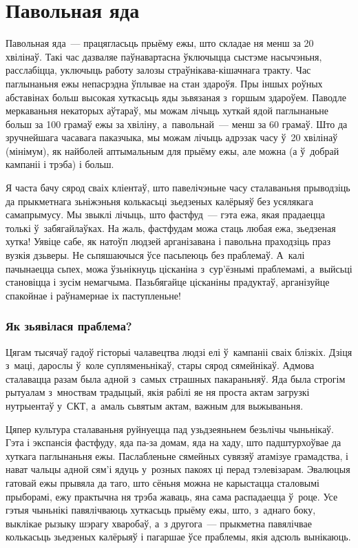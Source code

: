 \chapter{Павольная яда}

Павольная яда~--- працягласьць прыёму ежы, што складае ня менш за 20 хвілінаў. Такі час дазваляе паўнавартасна ўключыцца сыстэме насычэньня, расслабіцца, уключыць работу залозы страўнікава-кішачнага тракту. Час паглынаньня ежы непасрэдна ўплывае на стан здароўя. Пры іншых роўных абставінах больш высокая хуткасьць яды зьвязаная з~горшым здароўем. Паводле меркаваньня некаторых аўтараў, мы можам лічыць хуткай ядой паглынаньне больш за 100 грамаў ежы за хвіліну, а~павольнай~--- менш за 60 грамаў. Што да зручнейшага часавага паказчыка, мы можам лічыць адрэзак часу ў~20 хвілінаў (мінімум), як найболей аптымальным для прыёму ежы, але можна (а ў~добрай кампаніі і трэба) і больш.

Я часта бачу сярод сваіх кліентаў, што павелічэньне часу сталаваньня прыводзіць да прыкметнага зьніжэньня колькасьці зьедзеных калёрыяў без усялякага самапрымусу. Мы звыклі лічыць, што фастфуд~--- гэта ежа, якая прадаецца толькі ў~забягайлаўках. На жаль, фастфудам можа стаць любая ежа, зьедзеная хутка! Уявіце сабе, як натоўп людзей арганізавана і павольна праходзіць праз вузкія дзьверы. Не сьпяшаючыся ўсе пасьпеюць без праблемаў. А~калі пачынаецца сьпех, можа ўзьнікнуць цісканіна з~сур'ёзнымі праблемамі, а~выйсьці становіцца і зусім немагчыма. Пазьбягайце цісканіны прадуктаў, арганізуйце спакойнае і раўнамернае іх паступленьне!

\subsection{Як зьявілася праблема?}

Цягам тысячаў гадоў гісторыі чалавецтва людзі елі ў~кампаніі сваіх блізкіх. Дзіця з~маці, дарослы ў~коле супляменьнікаў, стары сярод сямейнікаў. Адмова сталавацца разам была адной з~самых страшных пакараньняў. Яда была строгім рытуалам з~мноствам традыцый, якія рабілі яе ня проста актам загрузкі нутрыентаў у~СКТ, а~амаль сьвятым актам, важным для выжываньня.

Цяпер культура сталаваньня руйнуецца пад узьдзеяньнем безьлічы чыньнікаў. Гэта і экспансія фастфуду, яда па-за домам, яда на хаду, што падштурхоўвае да хуткага паглынаньня ежы. Паслабленьне сямейных сувязяў атамізуе грамадства, і нават чальцы адной сям'і ядуць у~розных пакоях ці перад тэлевізарам. Эвалюцыя гатовай ежы прывяла да таго, што сёньня можна не карыстацца сталовымі прыборамі, ежу практычна ня трэба жаваць, яна сама распадаецца ў~роце. Усе гэтыя чыньнікі павялічваюць хуткасьць прыёму ежы, што, з~аднаго боку, выклікае рызыку шэрагу хваробаў, а~з другога~--- прыкметна павялічвае колькасьць зьедзеных калёрыяў і пагаршае ўсе праблемы, якія адсюль вынікаюць.

